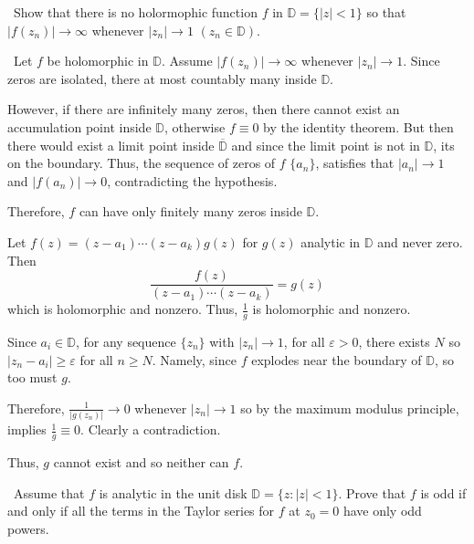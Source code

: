 \documentclass[12pt]{Homework}
\begin{document}
\begin{problem} $\,$
Show that there is no holormophic function $f$ in $\mathbb{D}=\{|z|<1\}$ so that $|f(z_n)|\to\infty$ whenever $|z_n|\to 1$ $(z_n\in\mathbb{D})$.
\end{problem}


\begin{solution}$\,$
Let $f$ be holomorphic in $\mathbb{D}$. Assume $|f(z_n)|\to\infty$ whenever $|z_n|\to 1$. Since zeros are isolated, there at most countably many inside $\mathbb{D}$.

However, if there are infinitely many zeros, then there cannot exist an accumulation point inside $\mathbb{D}$, otherwise $f\equiv 0$ by the identity theorem. But then there would exist a limit point inside $\overline{\mathbb{D}}$ and since the limit point is not in $\mathbb{D}$, its on the boundary. Thus, the sequence of zeros of $f$ $\{a_n\}$, satisfies that $|a_n|\to1$ and $|f(a_n)|\to0$, contradicting the hypothesis. 


Therefore, $f$ can have only finitely many zeros inside $\mathbb{D}$.

Let $f(z)=(z-a_1)\cdots(z-a_k)g(z)$ for $g(z)$ analytic in $\mathbb{D}$ and never zero. Then $$\frac{f(z)}{(z-a_1)\cdots(z-a_k)}=g(z)$$ which is holomorphic and nonzero. Thus, $\frac{1}{g}$ is holomorphic and nonzero.

Since $a_i\in\mathbb{D}$, for any sequence $\{z_n\}$ with $|z_n|\to 1$, for all $\varepsilon>0$, there exists $N$ so $|z_n-a_i|\ge\varepsilon$ for all $n\ge N$. Namely, since $f$ explodes near the boundary of $\mathbb{D}$, so too must $g$.

Therefore, $\frac{1}{|g(z_n)|}\to0$ whenever $|z_n|\to1$ so by the maximum modulus principle, implies $\frac{1}{g}\equiv0$. Clearly a contradiction.

Thus, $g$ cannot exist and so neither can $f$.
\end{solution}
\newpage



\begin{problem} $\,$
Assume that $f$ is analytic in the unit disk $\mathbb{D}=\{z:|z|<1\}.$ Prove that $f$ is odd if and only if all the terms in the Taylor series for $f$ at $z_0=0$ have only odd powers.
\end{problem}
\end{document}
